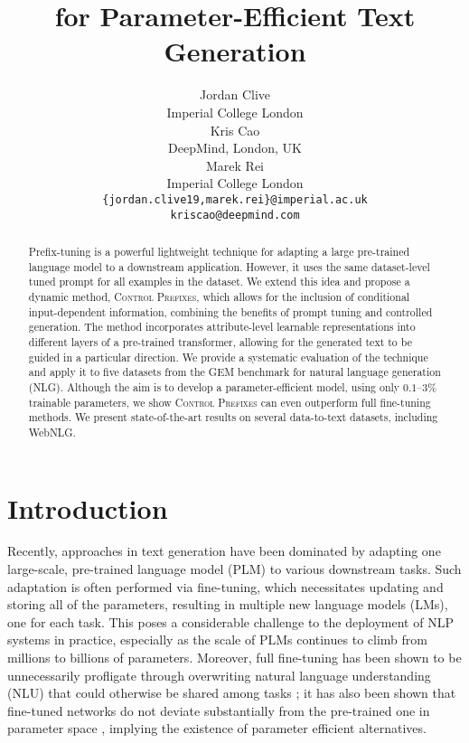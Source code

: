 \documentclass[11pt]{article}
\title{\control for Parameter-Efficient Text Generation}
\author{Jordan Clive\\
  Imperial College London \\
   \And
  Kris Cao \\
  DeepMind, London, UK \\
  \And
  Marek Rei \\
  Imperial College London
 \AND \\
 \texttt{\{jordan.clive19,marek.rei\}@imperial.ac.uk} \\
 \texttt{kriscao@deepmind.com} 
 }
\newcommand{\control}{\textsc{Control Prefixes}\xspace}
\begin{document}
\maketitle
\begin{abstract}


Prefix-tuning is a powerful lightweight technique for adapting a large pre-trained language model to a downstream application. However, it uses the same dataset-level tuned prompt for all examples in the dataset. We extend this idea and propose a dynamic method, \control, which allows for the inclusion of conditional input-dependent information, combining the benefits of prompt tuning and controlled generation. The method incorporates attribute-level learnable representations into different layers of a pre-trained transformer, allowing for the generated text to be guided in a particular direction. We provide a systematic evaluation of the technique and apply it to five datasets from the GEM benchmark for natural language generation (NLG). Although the aim is to develop a parameter-efficient model,  using only $0.1$–$3$\% trainable parameters, we show \control can even outperform full fine-tuning methods. We present state-of-the-art results on several data-to-text datasets, including WebNLG.

\end{abstract}


\section{Introduction}
Recently, approaches in text generation have been dominated by adapting one large-scale, pre-trained language model (PLM) to various downstream tasks. Such adaptation is often performed via fine-tuning, which necessitates updating and storing all of the parameters, resulting in multiple new language models (LMs), one for each task. This poses a considerable challenge to the deployment of NLP systems in practice, especially as the scale of PLMs continues to climb from millions to billions of parameters. Moreover, full fine-tuning has been shown to be unnecessarily profligate through overwriting natural language understanding (NLU) that could otherwise be shared among tasks \citep{poor_finetune}; it has also been shown that fine-tuned networks do not deviate substantially from the pre-trained one in parameter space \citep{aghajanyan20,dixit2020How}, implying the existence of parameter efficient alternatives.
\end{document}
